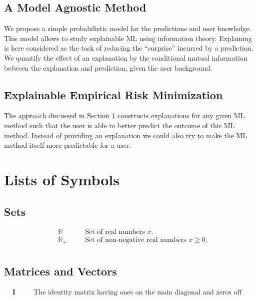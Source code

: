 \documentclass[12pt]{report}
\begin{document}
\section{A Model Agnostic Method}
\label{sec_model_agn_xml}

We propose a simple probabilistic model for the predictions and 
user knowledge. This model allows to study explainable ML using 
information theory. Explaining is here considered as the task of 
reducing the ``surprise'' incurred by a prediction. We quantify 
the effect of an explanation by the conditional mutual information 
between the explanation and prediction, given the user background. 

\section{Explainable Empirical Risk Minimization} 
The approach discussed in Section \ref{sec_model_agn_xml} constructs explanations 
for any given ML method such that the user is able to better predict 
the outcome of this ML method. Instead of providing an explanation 
we could also try to make the ML method itself more predictable for 
a user. 


\chapter{Lists of Symbols}

\section{Sets} 
\begin{align} 
&\mathbb{R}  &\quad &\mbox{Set of real numbers $x$.} \nonumber \\
&\mathbb{R}_{+}  &\quad &\mbox{Set of non-negative real numbers $x\geq0$.} \nonumber \\ \nonumber
\end{align} 

\section{Matrices and Vectors} 
\begin{align} 
&\mathbf{I}  &\quad &\mbox{The identity matrix having ones on the main diagonal and zeros off diagonal.} \nonumber 
\end{align} 
\end{document}
